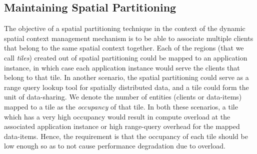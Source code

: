 \subsection{Maintaining Spatial Partitioning}
The objective of a spatial partitioning technique in the context of the dynamic spatial context management mechanism is to be able to associate multiple clients that belong to the same spatial context together. Each of the regions (that we call \textit{tiles}) created out of spatial partitioning could be mapped to an application instance, in which case each application instance would serve the clients that belong to that tile. In another scenario, the spatial partitioning could serve as a range query lookup tool for spatially distributed data, and a tile could form the unit of data-sharing. We denote the number of entities (clients or data-items) mapped to a tile as the \textit{occupancy} of that tile. In both these scenarios, a tile which has a very high occupancy would result in compute overload at the associated application instance or high range-query overhead for the mapped data-items. Hence, the requirement is that the occupancy of each tile should be low enough so as to not cause performance degradation due to overload. 
